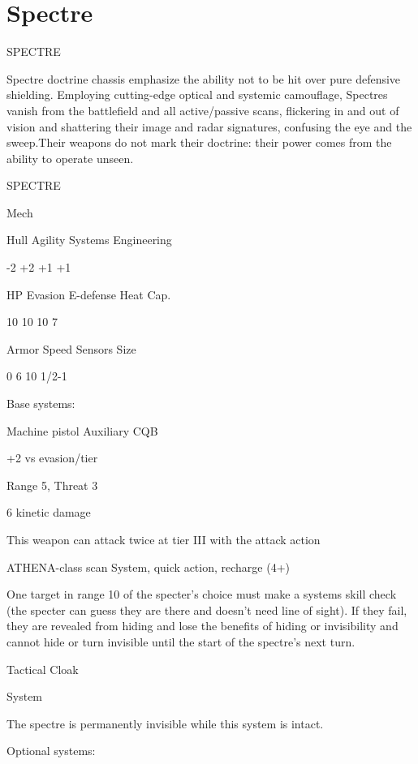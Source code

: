 \section{Spectre}

                                               SPECTRE  

Spectre doctrine chassis emphasize the ability not to be hit over pure defensive shielding.  
Employing cutting-edge optical and systemic camouflage, Spectres vanish from the battlefield  
and all active/passive scans, flickering in and out of vision and shattering their image and radar  
signatures, confusing the eye and the sweep.Their weapons do not mark their doctrine: their  
power comes from the ability to operate unseen. 
 

 SPECTRE 

 Mech 

 Hull       Agility      Systems       Engineering 

 -2         +2           +1            +1 

 HP         Evasion      E-defense     Heat Cap. 

 10         10           10            7 

 Armor      Speed        Sensors       Size 

 0          6            10            1/2-1 

Base systems:  

Machine pistol  
Auxiliary CQB
 
+2 vs evasion/tier
 
Range 5, Threat 3
 
6 kinetic damage
 
This weapon can attack twice at tier III with the attack action
 

ATHENA-class scan  
System, quick action, recharge (4+)
 
One target in range 10 of the specter’s choice must make a systems skill check (the specter can  
guess they are there and doesn’t need line of sight). If they fail, they are revealed from hiding and  
lose the benefits of hiding or invisibility and cannot hide or turn invisible until the start of the  
spectre’s next turn.
 

Tactical Cloak
 
System
 
The spectre is permanently invisible while this system is intact.
 

Optional systems:  

                                                                                                          


